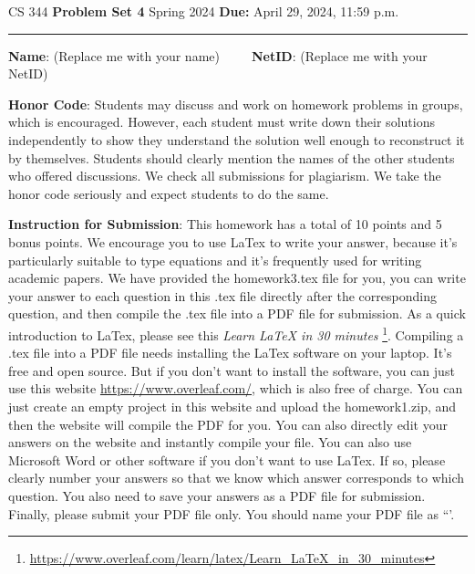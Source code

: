 \documentclass[12pt]{article}
\begin{document}
\noindent
CS 344 \hfill \textbf{Problem Set 4} \newline 
{Spring 2024} \hfill \textbf{Due:} April 29, 2024, 11:59 p.m.

\noindent
\rule{\linewidth}{0.4pt}
\vspace{.4cm}

\textbf{Name}: ({\color{blue}Replace me with your name})~~~~~\textbf{NetID}: ({\color{blue}Replace me with your NetID})

\vspace{.5cm}

\textbf{Honor Code}: Students may discuss and work on homework problems in groups, which is encouraged. However, each student must write down their solutions independently to show they understand the solution well enough to reconstruct it by themselves.  Students should clearly mention the names of the other students who offered discussions. We check all submissions for plagiarism. We take the honor code seriously and expect students to do the same.


\vspace{.5cm}

\textbf{Instruction for Submission}: This homework has a total of 10 points and 5 bonus points. We encourage you to use LaTex to write your answer, because it's particularly suitable to type equations and it's frequently used for writing academic papers. We have provided the homework3.tex file for you, you can write your answer to each question in this .tex file directly after the corresponding question, and then compile the .tex file into a PDF file for submission. As a quick introduction to LaTex, please see this \textit{Learn LaTeX in 30 minutes} \footnote{\url{https://www.overleaf.com/learn/latex/Learn_LaTeX_in_30_minutes}}. Compiling a .tex file into a PDF file needs installing the LaTex software on your laptop. It's free and open source. But if you don't want to install the software, you can just use this website \url{https://www.overleaf.com/}, which is also free of charge. You can just create an empty project in this website and upload the homework1.zip, and then the website will compile the PDF for you. You can also directly edit your answers on the website and instantly compile your file. You can also use Microsoft Word or other software if you don't want to use LaTex. If so, please clearly number your answers so that we know which answer corresponds to which question. You also need to save your answers as a PDF file for submission. Finally, please submit your PDF file only. You should name your PDF file as ``{\color{blue}{Firstname-Lastname-NetID.pdf'}}'.
\end{document}
